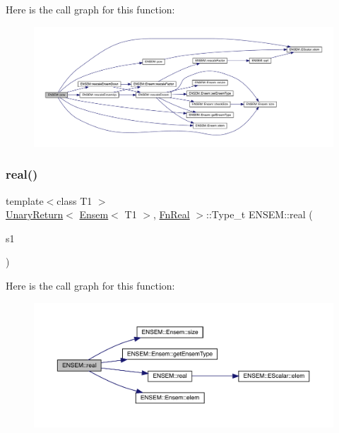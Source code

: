 Here is the call graph for this function\+:\nopagebreak
\begin{figure}[H]
\begin{center}
\leavevmode
\includegraphics[width=350pt]{d1/d9e/group__eensem_gae3b272ae394d114d478f320d24ca05df_cgraph}
\end{center}
\end{figure}
\mbox{\label{group__eensem_ga633b11ccc18bea07f60b3c9589dafe58}} 
\subsubsection{\texorpdfstring{real()}{real()}}
{\footnotesize\ttfamily template$<$class T1 $>$ \\
\mbox{\hyperlink{structENSEM_1_1UnaryReturn}{Unary\+Return}}$<$ \mbox{\hyperlink{classENSEM_1_1Ensem}{Ensem}}$<$ T1 $>$, \mbox{\hyperlink{structENSEM_1_1FnReal}{Fn\+Real}} $>$\+::Type\+\_\+t E\+N\+S\+E\+M\+::real (\begin{DoxyParamCaption}\item[{const \mbox{\hyperlink{classENSEM_1_1Ensem}{Ensem}}$<$ T1 $>$ \&}]{s1 }\end{DoxyParamCaption})\hspace{0.3cm}{\ttfamily [inline]}}

Here is the call graph for this function\+:\nopagebreak
\begin{figure}[H]
\begin{center}
\leavevmode
\includegraphics[width=350pt]{d1/d9e/group__eensem_ga633b11ccc18bea07f60b3c9589dafe58_cgraph}
\end{center}
\end{figure}
\mbox{\label{group__eensem_gadbb88f64cff72d8d368551b6de6753f9}} 
